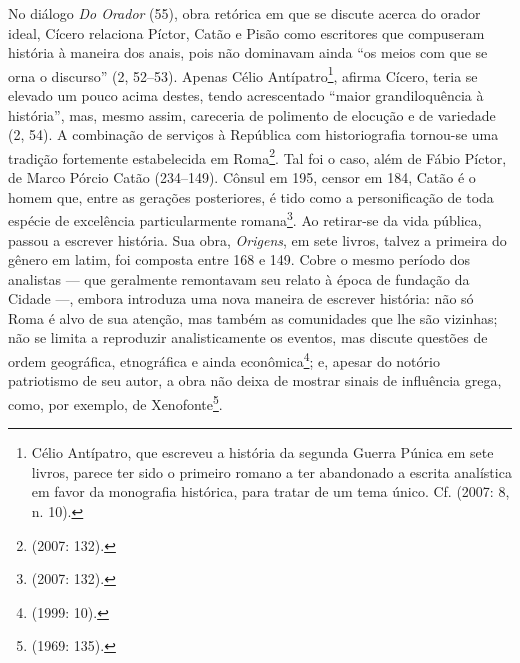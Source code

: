 No diálogo \emph{Do Orador} (55), obra retórica em que se discute acerca
do orador ideal, Cícero relaciona Píctor, Catão e Pisão como escritores que
compuseram história à maneira dos anais, pois não dominavam ainda “os meios com
que se orna o discurso” (2, 52--53). Apenas Célio Antípatro\footnote{Célio
Antípatro, que escreveu a história da segunda Guerra Púnica em sete livros,
parece ter sido o primeiro romano a ter abandonado a escrita analística em
favor da monografia histórica, para tratar de um tema único.  Cf. 
(2007: 8, n. 10).}, afirma Cícero, teria se elevado um pouco acima destes,
tendo acrescentado “maior grandiloquência à história”, mas, mesmo assim,
careceria de polimento de elocução e de variedade (2, 54).  A combinação de
serviços à República com historiografia tornou-se uma tradição fortemente
estabelecida em Roma\footnote{
(2007: 132).}. Tal foi o caso, além de
Fábio Píctor, de Marco Pórcio Catão (234--149). Cônsul em 195, censor em 184,
Catão é o homem que, entre as gerações posteriores, é tido como a
personificação de toda espécie de excelência particularmente romana\footnote{
(2007: 132).}. Ao retirar-se da vida pública, passou a escrever história.
Sua obra, \emph{Origens}, em sete livros, talvez a primeira do gênero em latim,
foi composta entre 168 e 149. Cobre o mesmo período dos analistas --- que
geralmente remontavam seu relato à época de fundação da Cidade ---, embora
introduza uma nova maneira de escrever história: não só Roma é alvo de sua
atenção, mas também as comunidades que lhe são vizinhas; não se limita a
reproduzir analisticamente os eventos, mas discute questões de ordem
geográfica, etnográfica e ainda econômica\footnote{ (1999: 10).};
e, apesar do notório patriotismo de seu autor, a obra não deixa de mostrar
sinais de influência grega, como, por exemplo, de Xenofonte\footnote{ 
(1969: 135).}.

